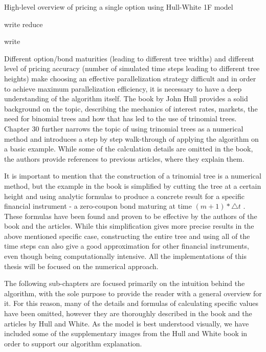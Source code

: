 \begin{algorithm}[H]
    \DontPrintSemicolon
    \caption{High-level overview of pricing a single option using Hull-White 1F model     \label{alg:loops}}
    
     {
         {
            write\;
        }
        reduce\;
    }
    
     {
         {
            write\;
        }
    }
\end{algorithm}

Different option/bond maturities (leading to different tree widths) and different level of pricing accuracy (number of simulated time steps leading to different tree heights) make choosing an effective parallelization strategy difficult and in order to achieve maximum parallelization efficiency, it is necessary to have a deep understanding of the algorithm itself. The book by John Hull\cite{ofod} provides a solid background on the topic, describing the mechanics of interest rates, markets, the need for binomial trees and how that has led to the use of trinomial trees. Chapter 30 further narrows the topic of using trinomial trees as a numerical method and introduces a step by step walk-through of applying the algorithm on a basic example. While some of the calculation details are omitted in the book, the authors provide references to previous articles\cite{npfits}\cite{uhwirt}, where they explain them. 

It is important to mention that the construction of a trinomial tree is a numerical method, but the example in the book is simplified by cutting the tree at a certain height and using analytic formulas to produce a concrete result for a specific financial instrument - a zero-coupon bond maturing at time $(m + 1) * \triangle t$ \cite[pg. 704]{ofod}. These formulas have been found and proven to be effective by the authors of the book and the articles. While this simplification gives more precise results in the above mentioned specific case, constructing the entire tree and using all of the time steps can also give a good approximation for other financial instruments, even though being computationally intensive. All the implementations of this thesis will be focused on the numerical approach.

The following sub-chapters are focused primarily on the intuition behind the algorithm, with the sole purpose to provide the reader with a general overview for it. For this reason, many of the details and formulas of calculating specific values have been omitted, however they are thoroughly described in the book and the articles by Hull and White. As the model is best understood visually, we have included some of the supplementary images from the Hull and White book in order to support our algorithm explanation. 

